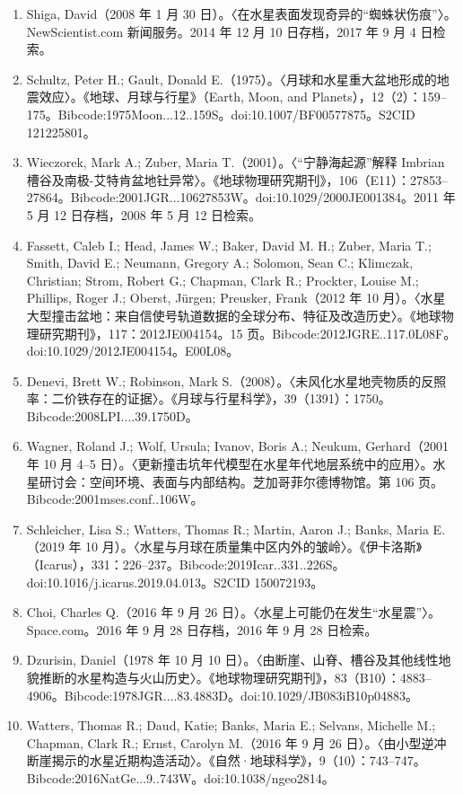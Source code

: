 \begin{enumerate}
    \item Shiga, David（2008 年 1 月 30 日）。〈在水星表面发现奇异的“蜘蛛状伤痕”〉。NewScientist.com 新闻服务。2014 年 12 月 10 日存档，2017 年 9 月 4 日检索。
    \item Schultz, Peter H.; Gault, Donald E.（1975）。〈月球和水星重大盆地形成的地震效应〉。《地球、月球与行星》（Earth, Moon, and Planets），12（2）：159–175。Bibcode:1975Moon...12..159S。doi:10.1007/BF00577875。S2CID 121225801。
    \item Wieczorek, Mark A.; Zuber, Maria T.（2001）。〈“宁静海起源”解释 Imbrian 槽谷及南极-艾特肯盆地钍异常〉。《地球物理研究期刊》，106（E11）：27853–27864。Bibcode:2001JGR...10627853W。doi:10.1029/2000JE001384。2011 年 5 月 12 日存档，2008 年 5 月 12 日检索。
    \item Fassett, Caleb I.; Head, James W.; Baker, David M. H.; Zuber, Maria T.; Smith, David E.; Neumann, Gregory A.; Solomon, Sean C.; Klimczak, Christian; Strom, Robert G.; Chapman, Clark R.; Prockter, Louise M.; Phillips, Roger J.; Oberst, Jürgen; Preusker, Frank（2012 年 10 月）。〈水星大型撞击盆地：来自信使号轨道数据的全球分布、特征及改造历史〉。《地球物理研究期刊》，117：2012JE004154。15 页。Bibcode:2012JGRE..117.0L08F。doi:10.1029/2012JE004154。E00L08。
    \item Denevi, Brett W.; Robinson, Mark S.（2008）。〈未风化水星地壳物质的反照率：二价铁存在的证据〉。《月球与行星科学》，39（1391）：1750。Bibcode:2008LPI....39.1750D。
    \item Wagner, Roland J.; Wolf, Ursula; Ivanov, Boris A.; Neukum, Gerhard（2001 年 10 月 4–5 日）。〈更新撞击坑年代模型在水星年代地层系统中的应用〉。水星研讨会：空间环境、表面与内部结构。芝加哥菲尔德博物馆。第 106 页。Bibcode:2001mses.conf..106W。
    \item Schleicher, Lisa S.; Watters, Thomas R.; Martin, Aaron J.; Banks, Maria E.（2019 年 10 月）。〈水星与月球在质量集中区内外的皱岭〉。《伊卡洛斯》（Icarus），331：226–237。Bibcode:2019Icar..331..226S。doi:10.1016/j.icarus.2019.04.013。S2CID 150072193。
    \item Choi, Charles Q.（2016 年 9 月 26 日）。〈水星上可能仍在发生“水星震”〉。Space.com。2016 年 9 月 28 日存档，2016 年 9 月 28 日检索。
    \item Dzurisin, Daniel（1978 年 10 月 10 日）。〈由断崖、山脊、槽谷及其他线性地貌推断的水星构造与火山历史〉。《地球物理研究期刊》，83（B10）：4883–4906。Bibcode:1978JGR....83.4883D。doi:10.1029/JB083iB10p04883。
    \item Watters, Thomas R.; Daud, Katie; Banks, Maria E.; Selvans, Michelle M.; Chapman, Clark R.; Ernst, Carolyn M.（2016 年 9 月 26 日）。〈由小型逆冲断崖揭示的水星近期构造活动〉。《自然·地球科学》，9（10）：743–747。Bibcode:2016NatGe...9..743W。doi:10.1038/ngeo2814。

\end{enumerate}
